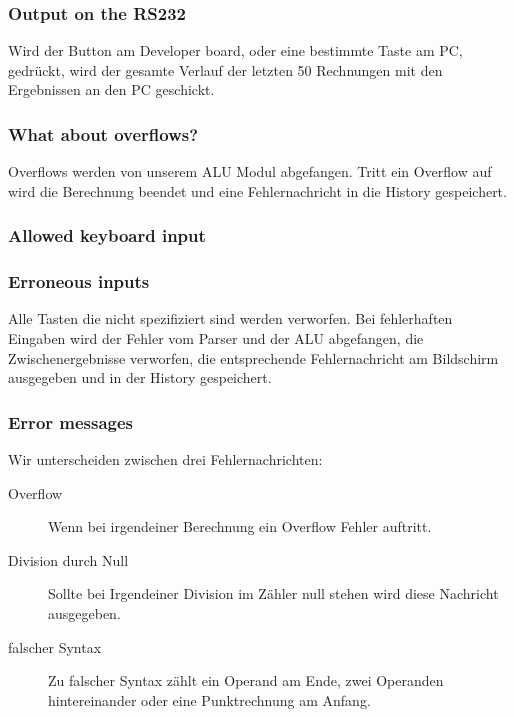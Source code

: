 \subsubsection{Output on the RS232}
Wird der Button am Developer board, oder eine bestimmte Taste am PC, gedrückt, wird der gesamte Verlauf der letzten 50 Rechnungen mit den Ergebnissen an den PC geschickt.
\subsubsection{What about overflows?}
Overflows werden von unserem ALU Modul abgefangen. Tritt ein Overflow auf wird die Berechnung beendet und eine Fehlernachricht in die History gespeichert.
\subsubsection{Allowed keyboard input}

\subsubsection{Erroneous inputs}
Alle Tasten die nicht spezifiziert sind werden verworfen. Bei fehlerhaften Eingaben wird der Fehler vom Parser und der ALU abgefangen, die Zwischenergebnisse verworfen, die entsprechende Fehlernachricht am Bildschirm ausgegeben und in der History gespeichert.
\subsubsection{Error messages}
Wir unterscheiden zwischen drei Fehlernachrichten:
\begin{description}
 \item[Overflow] Wenn bei irgendeiner Berechnung ein Overflow Fehler auftritt. 
 \item[Division durch Null] Sollte bei Irgendeiner Division im Zähler null stehen wird diese Nachricht ausgegeben.
 \item[falscher Syntax]Zu falscher Syntax zählt ein Operand am Ende, zwei Operanden hintereinander oder eine Punktrechnung am Anfang.
\end{description}


